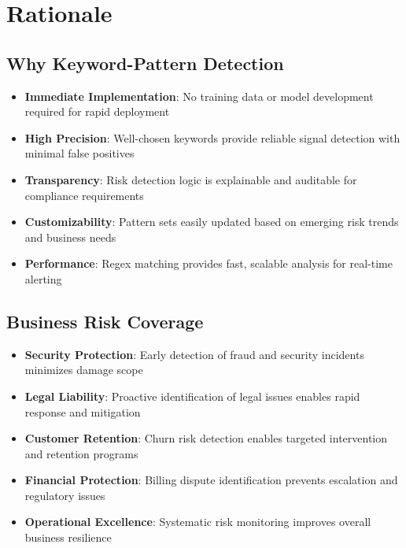 \documentclass[11pt]{article}
\begin{document}
\section{Rationale}

\subsection{Why Keyword-Pattern Detection}
\begin{itemize}
\item \textbf{Immediate Implementation}: No training data or model development required for rapid deployment
\item \textbf{High Precision}: Well-chosen keywords provide reliable signal detection with minimal false positives
\item \textbf{Transparency}: Risk detection logic is explainable and auditable for compliance requirements
\item \textbf{Customizability}: Pattern sets easily updated based on emerging risk trends and business needs
\item \textbf{Performance}: Regex matching provides fast, scalable analysis for real-time alerting
\end{itemize}

\subsection{Business Risk Coverage}
\begin{itemize}
\item \textbf{Security Protection}: Early detection of fraud and security incidents minimizes damage scope
\item \textbf{Legal Liability}: Proactive identification of legal issues enables rapid response and mitigation
\item \textbf{Customer Retention}: Churn risk detection enables targeted intervention and retention programs
\item \textbf{Financial Protection}: Billing dispute identification prevents escalation and regulatory issues
\item \textbf{Operational Excellence}: Systematic risk monitoring improves overall business resilience
\end{itemize}
\end{document}

